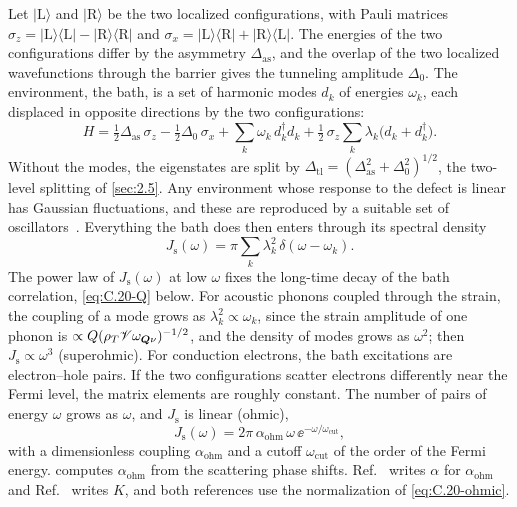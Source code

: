 Let $|\mathrm{L}\rangle$ and $|\mathrm{R}\rangle$ be the two localized configurations, with Pauli matrices $\sigma_z = |\mathrm{L}\rangle\langle\mathrm{L}| - |\mathrm{R}\rangle\langle\mathrm{R}|$ and $\sigma_x = |\mathrm{L}\rangle\langle\mathrm{R}| + |\mathrm{R}\rangle\langle\mathrm{L}|$. The energies of the two configurations differ by the asymmetry $\Delta_{\mathrm{as}}$, and the overlap of the two localized wavefunctions through the barrier gives the tunneling amplitude $\Delta_0$. The environment, the bath, is a set of harmonic modes $d_k$ of energies $\omega_k$, each displaced in opposite directions by the two configurations:
\begin{equation}
  H = \tfrac12\Delta_{\mathrm{as}}\,\sigma_z - \tfrac12\Delta_0\,\sigma_x + \sum_k\omega_k\,d_k^\dagger d_k + \tfrac12\,\sigma_z\sum_k\lambda_k\bigl(d_k + d_k^\dagger\bigr) .
  \label{eq:C.20-H}
\end{equation}
Without the modes, the eigenstates are split by $\Delta_{\mathrm{tl}} = (\Delta_{\mathrm{as}}^2 + \Delta_0^2)^{1/2}$, the two-level splitting of \cref{sec:2.5}. Any environment whose response to the defect is linear has Gaussian fluctuations, and these are reproduced by a suitable set of oscillators~\cite{leggett1987dynamics}. Everything the bath does then enters through its spectral density
\begin{equation}
  J_{\mathrm{s}}(\omega) = \pi\sum_k\lambda_k^2\,\delta(\omega - \omega_k) .
  \label{eq:C.20-J}
\end{equation}
The power law of $J_{\mathrm{s}}(\omega)$ at low $\omega$ fixes the long-time decay of the bath correlation, \cref{eq:C.20-Q} below. For acoustic phonons coupled through the strain, the coupling of a mode grows as $\lambda_k^2 \propto \omega_k$, since the strain amplitude of one phonon is $\propto Q(\rho_T\mathscr{V}\omega_{\bm{Q}\nu})^{-1/2}$, and the density of modes grows as $\omega^2$; then $J_{\mathrm{s}} \propto \omega^3$ (superohmic). For conduction electrons, the bath excitations are electron--hole pairs. If the two configurations scatter electrons differently near the Fermi level, the matrix elements are roughly constant. The number of pairs of energy $\omega$ grows as $\omega$, and $J_{\mathrm{s}}$ is linear (ohmic),
\begin{equation}
  J_{\mathrm{s}}(\omega) = 2\pi\,\alpha_{\mathrm{ohm}}\,\omega\,\ee^{-\omega/\omega_{\mathrm{cut}}} ,
  \label{eq:C.20-ohmic}
\end{equation}
with a dimensionless coupling $\alpha_{\mathrm{ohm}}$ and a cutoff $\omega_{\mathrm{cut}}$ of the order of the Fermi energy.  computes $\alpha_{\mathrm{ohm}}$ from the scattering phase shifts. Ref.~\cite{leggett1987dynamics} writes $\alpha$ for $\alpha_{\mathrm{ohm}}$ and Ref.~\cite{qureshi1995dynamics} writes $K$, and both references use the normalization of \cref{eq:C.20-ohmic}.

